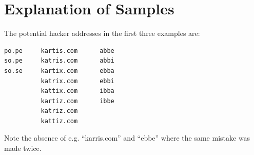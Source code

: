 \section*{Explanation of Samples}

The potential hacker addresses in the first three examples are:
\begin{verbatim}
po.pe     kartis.com      abbe
so.pe     katris.com      abbi
so.se     kartix.com      ebba
          katrix.com      ebbi
          kattix.com      ibba
          kartiz.com      ibbe
          katriz.com
          kattiz.com
\end{verbatim}
Note the absence of e.g. ``karris.com'' and ``ebbe'' where the same mistake was made twice.
